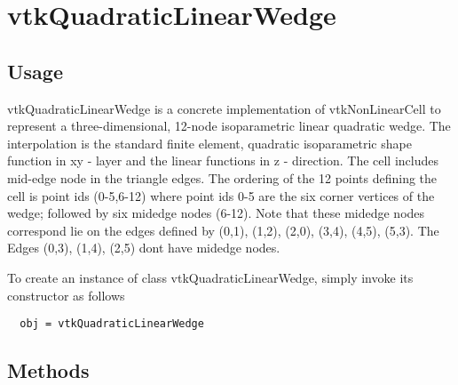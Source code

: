 \section{vtkQuadraticLinearWedge}

\subsection{Usage}

 vtkQuadraticLinearWedge is a concrete implementation of vtkNonLinearCell to
 represent a three-dimensional, 12-node isoparametric linear quadratic
 wedge. The interpolation is the standard finite element, quadratic
 isoparametric shape function in xy - layer and the linear functions in z - direction. 
 The cell includes mid-edge node in the triangle edges. The
 ordering of the 12 points defining the cell is point ids (0-5,6-12)
 where point ids 0-5 are the six corner vertices of the wedge; followed by
 six midedge nodes (6-12). Note that these midedge nodes correspond lie
 on the edges defined by (0,1), (1,2), (2,0), (3,4), (4,5), (5,3).
 The Edges (0,3), (1,4), (2,5) dont have midedge nodes.


To create an instance of class vtkQuadraticLinearWedge, simply
invoke its constructor as follows
\begin{verbatim}
  obj = vtkQuadraticLinearWedge
\end{verbatim}
\subsection{Methods}

